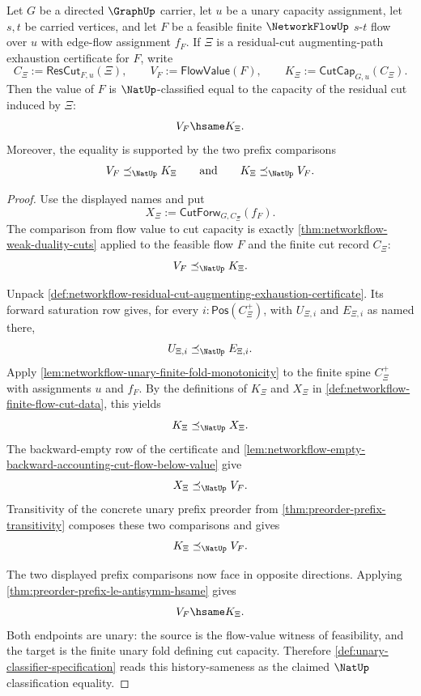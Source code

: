 \begin{theorem}
\label{thm:networkflow-maxflow-mincut-equality-from-residual-exhaustion}
Let $G$ be a directed $\GraphUp$ carrier, let $u$ be a unary capacity assignment, let $s,t$ be carried vertices, and let $F$ be a feasible finite $\NetworkFlowUp$ $s$-$t$ flow over $u$ with edge-flow assignment $f_F$. If $\Xi$ is a residual-cut augmenting-path exhaustion certificate for $F$, write
$$
C_\Xi:=\mathsf{ResCut}_{F,u}(\Xi),
\qquad
V_F:=\mathsf{FlowValue}(F),
\qquad
K_\Xi:=\mathsf{CutCap}_{G,u}(C_\Xi).
$$
Then the value of $F$ is $\NatUp$-classified equal to the capacity of the residual cut induced by $\Xi$:
$$
V_F\hsame K_\Xi.
$$
Moreover, the equality is supported by the two prefix comparisons
$$
V_F
\preceq_{\NatUp}
K_\Xi
\qquad\text{and}\qquad
K_\Xi
\preceq_{\NatUp}
V_F.
$$
\end{theorem}
\begin{proof}
Use the displayed names and put
$$
X_\Xi:=\mathsf{CutForw}_{G,C_\Xi}(f_F).
$$
The comparison from flow value to cut capacity is exactly \autoref{thm:networkflow-weak-duality-cuts} applied to the feasible flow $F$ and the finite cut record $C_\Xi$:
$$
V_F\preceq_{\NatUp}K_\Xi.
$$

Unpack \autoref{def:networkflow-residual-cut-augmenting-exhaustion-certificate}. Its forward saturation row gives, for every $i:\mathsf{Pos}(C_\Xi^{+})$, with $U_{\Xi,i}$ and $E_{\Xi,i}$ as named there,
$$
U_{\Xi,i}
\preceq_{\NatUp}
E_{\Xi,i}.
$$
Apply \autoref{lem:networkflow-unary-finite-fold-monotonicity} to the finite spine $C_\Xi^{+}$ with assignments $u$ and $f_F$. By the definitions of $K_\Xi$ and $X_\Xi$ in \autoref{def:networkflow-finite-flow-cut-data}, this yields
$$
K_\Xi
\preceq_{\NatUp}
X_\Xi.
$$
The backward-empty row of the certificate and \autoref{lem:networkflow-empty-backward-accounting-cut-flow-below-value} give
$$
X_\Xi
\preceq_{\NatUp}
V_F.
$$
Transitivity of the concrete unary prefix preorder from \autoref{thm:preorder-prefix-transitivity} composes these two comparisons and gives
$$
K_\Xi
\preceq_{\NatUp}
V_F.
$$

The two displayed prefix comparisons now face in opposite directions. Applying \autoref{thm:preorder-prefix-le-antisymm-hsame} gives
$$
V_F\hsame K_\Xi.
$$
Both endpoints are unary: the source is the flow-value witness of feasibility, and the target is the finite unary fold defining cut capacity. Therefore \autoref{def:unary-classifier-specification} reads this history-sameness as the claimed $\NatUp$ classification equality.
\end{proof}

